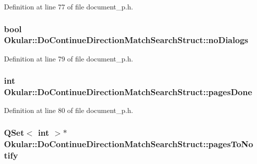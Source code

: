 Definition at line 77 of file document\+\_\+p.\+h.

\hypertarget{structOkular_1_1DoContinueDirectionMatchSearchStruct_a3092dffdbf938354e545665e1d6b575d}{
\subsubsection[{no\+Dialogs}]{\setlength{\rightskip}{0pt plus 5cm}bool Okular\+::\+Do\+Continue\+Direction\+Match\+Search\+Struct\+::no\+Dialogs}}\label{structOkular_1_1DoContinueDirectionMatchSearchStruct_a3092dffdbf938354e545665e1d6b575d}


Definition at line 79 of file document\+\_\+p.\+h.

\hypertarget{structOkular_1_1DoContinueDirectionMatchSearchStruct_a0fe5f9b4cf4ef21a355f87a180fae56f}{
\subsubsection[{pages\+Done}]{\setlength{\rightskip}{0pt plus 5cm}int Okular\+::\+Do\+Continue\+Direction\+Match\+Search\+Struct\+::pages\+Done}}\label{structOkular_1_1DoContinueDirectionMatchSearchStruct_a0fe5f9b4cf4ef21a355f87a180fae56f}


Definition at line 80 of file document\+\_\+p.\+h.

\hypertarget{structOkular_1_1DoContinueDirectionMatchSearchStruct_a27dfab7440a3e4889b39307626a6aa7a}{
\subsubsection[{pages\+To\+Notify}]{\setlength{\rightskip}{0pt plus 5cm}Q\+Set$<$ int $>$$\ast$ Okular\+::\+Do\+Continue\+Direction\+Match\+Search\+Struct\+::pages\+To\+Notify}}\label{structOkular_1_1DoContinueDirectionMatchSearchStruct_a27dfab7440a3e4889b39307626a6aa7a}


